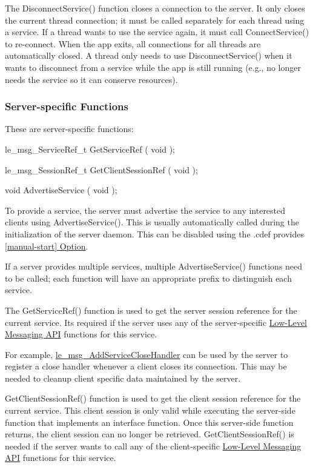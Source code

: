 The Disconnect\+Service() function closes a connection to the server. It only closes the current thread connection; it must be called separately for each thread using a service. If a thread wants to use the service again, it must call Connect\+Service() to re-\/connect. When the app exits, all connections for all threads are automatically closed. A thread only needs to use Disconnect\+Service() when it wants to disconnect from a service while the app is still running (e.\+g., no longer needs the service so it can conserve resources).\hypertarget{interface_def_lang_c_interfaceDefLangC_server}{}\subsubsection{Server-\/specific Functions}\label{interface_def_lang_c_interfaceDefLangC_server}
These are server-\/specific functions\+:

\begin{DoxyVerb}le_msg_ServiceRef_t GetServiceRef
(
    void
);

le_msg_SessionRef_t GetClientSessionRef
(
    void
);

void AdvertiseService
(
    void
);
\end{DoxyVerb}


To provide a service, the server must advertise the service to any interested clients using {\ttfamily Advertise\+Service()}. This is usually automatically called during the initialization of the server daemon. This can be disabled using the .cdef provides \hyperlink{def_files_cdef_defFilesCdef_providesApiManualStart}{\mbox{[}manual-\/start\mbox{]} Option}.

If a server provides multiple services, multiple {\ttfamily Advertise\+Service()} functions need to be called; each function will have an appropriate prefix to distinguish each service.

The {\ttfamily Get\+Service\+Ref()} function is used to get the server session reference for the current service. It\textquotesingle{}s required if the server uses any of the server-\/specific \hyperlink{c_messaging}{Low-\/\+Level Messaging A\+P\+I} functions for this service.

For example, \hyperlink{le__messaging_8h_a426dfbae396599d80e52902165368907}{le\+\_\+msg\+\_\+\+Add\+Service\+Close\+Handler} can be used by the server to register a close handler whenever a client closes its connection. This may be needed to cleanup client specific data maintained by the server.

{\ttfamily Get\+Client\+Session\+Ref()} function is used to get the client session reference for the current service. This client session is only valid while executing the server-\/side function that implements an interface function. Once this server-\/side function returns, the client session can no longer be retrieved. {\ttfamily Get\+Client\+Session\+Ref()} is needed if the server wants to call any of the client-\/specific \hyperlink{c_messaging}{Low-\/\+Level Messaging A\+P\+I} functions for this service.

